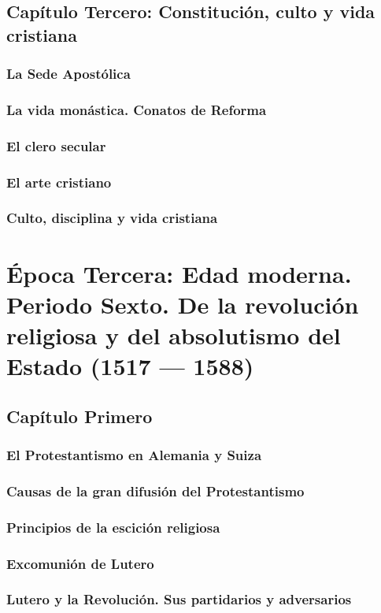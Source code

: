 \raggedbottom{} \documentclass[12pt, a4paper]{book}
\begin{document}
\chapter{Capítulo Tercero: Constitución, culto y vida cristiana}
\section{La Sede Apostólica}
\section{La vida monástica. Conatos de Reforma}
\section{El clero secular}
\section{El arte cristiano}
\section{Culto, disciplina y vida cristiana}
\part{Época Tercera: Edad moderna. Periodo Sexto. De la revolución religiosa y del absolutismo del Estado (1517 --- 1588)}
\chapter{Capítulo Primero}
\section{El Protestantismo en Alemania y Suiza}
\section{Causas de la gran difusión del Protestantismo}
\section{Principios de la escición religiosa}
\section{Excomunión de Lutero}
\section{Lutero y la Revolución. Sus partidarios y adversarios}
\end{document}
